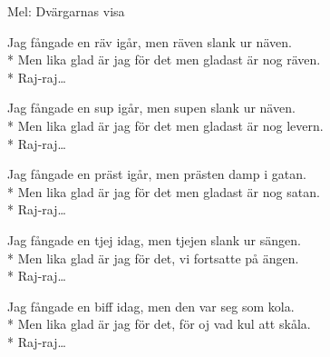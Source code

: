 \begin{SongText}[Räven v2]
    \begin{SongInfo}
        Mel: Dvärgarnas visa
    \end{SongInfo}
    \begin{SongVerse}
        Jag fångade en räv igår, men räven slank ur näven.\\*%
        Men lika glad är jag för det men gladast är nog räven.\\*%
        Raj-raj…
    \end{SongVerse}
    \begin{SongVerse}
        Jag fångade en sup igår, men supen slank ur näven.\\*%
        Men lika glad är jag för det men gladast är nog levern.\\*%
        Raj-raj…
    \end{SongVerse}
    \begin{SongVerse}
        Jag fångade en präst igår, men prästen damp i gatan.\\*%
        Men lika glad är jag för det men gladast är nog satan.\\*%
        Raj-raj…
    \end{SongVerse}
    \begin{SongVerse}
        Jag fångade en tjej idag, men tjejen slank ur sängen.\\*%
        Men lika glad är jag för det, vi fortsatte på ängen.\\*%
        Raj-raj…
    \end{SongVerse}
    \begin{SongVerse}
        Jag fångade en biff idag, men den var seg som kola.\\*%
        Men lika glad är jag för det, för oj vad kul att skåla.\\*%
        Raj-raj…
    \end{SongVerse}
\end{SongText}
